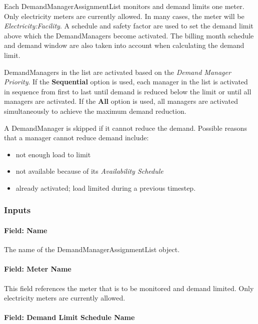 Each DemandManagerAssignmentList monitors and demand limits one meter. Only electricity meters are currently allowed. In many cases, the meter will be \emph{Electricity:Facility}. A schedule and safety factor are used to set the demand limit above which the DemandManagers become activated. The billing month schedule and demand window are also taken into account when calculating the demand limit.

DemandManagers in the list are activated based on the \emph{Demand Manager Priority}. If the \textbf{Sequential} option is used, each manager in the list is activated in sequence from first to last until demand is reduced below the limit or until all managers are activated. If the \textbf{All} option is used, all managers are activated simultaneously to achieve the maximum demand reduction.

A DemandManager is skipped if it cannot reduce the demand. Possible reasons that a manager cannot reduce demand include:

\begin{itemize}
\item
  not enough load to limit
\item
  not available because of its \emph{Availability Schedule}
\item
  already activated; load limited during a previous timestep.
\end{itemize}

\subsubsection{Inputs}\label{inputs-010}

\paragraph{Field: Name}\label{field-name-009}

The name of the DemandManagerAssignmentList object.

\paragraph{Field: Meter Name}\label{field-meter-name}

This field references the meter that is to be monitored and demand limited. Only electricity meters are currently allowed.

\paragraph{Field: Demand Limit Schedule Name}\label{field-demand-limit-schedule-name}


